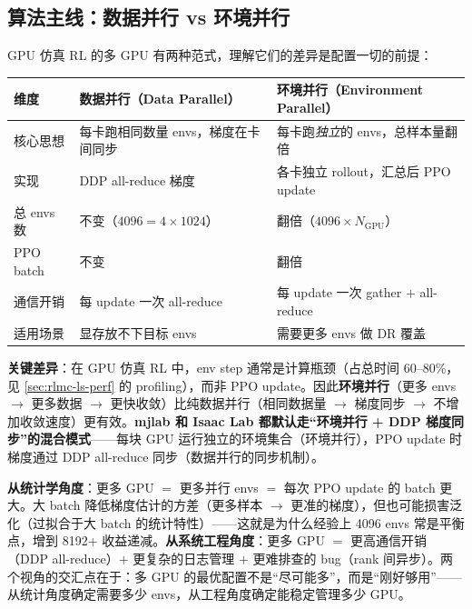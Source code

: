 \subsection{算法主线：数据并行 vs 环境并行}
\label{sec:rlmc-ls-dp-vs-ep}

GPU 仿真 RL 的多 GPU 有两种范式，理解它们的差异是配置一切的前提：

\begin{center}
\small
\begin{tabular}{@{}p{2.6cm}p{4.5cm}p{4.7cm}@{}}
\toprule
维度 & 数据并行（Data Parallel） & 环境并行（Environment Parallel） \\
\midrule
核心思想 & 每卡跑相同数量 envs，梯度在卡间同步 & 每卡跑\emph{独立}的 envs，总样本量翻倍 \\
实现 & DDP all-reduce 梯度 & 各卡独立 rollout，汇总后 PPO update \\
总 envs 数 & 不变（$4096=4\times1024$） & 翻倍（$4096\times N_{\text{GPU}}$） \\
PPO batch & 不变 & 翻倍 \\
通信开销 & 每 update 一次 all-reduce & 每 update 一次 gather $+$ all-reduce \\
适用场景 & 显存放不下目标 envs & 需要更多 envs 做 DR 覆盖 \\
\bottomrule
\end{tabular}
\end{center}

\textbf{关键差异}：在 GPU 仿真 RL 中，env step 通常是计算瓶颈（占总时间 60--80\%，见 \cref{sec:rlmc-ls-perf} 的 profiling），而非 PPO update。因此\textbf{环境并行}（更多 envs $\to$ 更多数据 $\to$ 更快收敛）比纯数据并行（相同数据量 $\to$ 梯度同步 $\to$ 不增加收敛速度）更有效。\textbf{mjlab 和 Isaac Lab 都默认走“环境并行 + DDP 梯度同步”的混合模式}——每块 GPU 运行独立的环境集合（环境并行），PPO update 时梯度通过 DDP all-reduce 同步（数据并行的同步机制）。

\begin{insight}\label{ins:rlmc-ls-twoview}
\textbf{从统计学角度}：更多 GPU $=$ 更多并行 envs $=$ 每次 PPO update 的 batch 更大。大 batch 降低梯度估计的方差（更多样本 $\to$ 更准的梯度），但也可能损害泛化（过拟合于大 batch 的统计特性）——这就是为什么经验上 4096 envs 常是平衡点，增到 8192+ 收益递减。\textbf{从系统工程角度}：更多 GPU $=$ 更高通信开销（DDP all-reduce）$+$ 更复杂的日志管理 $+$ 更难排查的 bug（rank 间异步）。两个视角的交汇点在于：多 GPU 的最优配置不是“尽可能多”，而是“刚好够用”——从统计角度确定需要多少 envs，从工程角度确定能稳定管理多少 GPU。
\end{insight}

